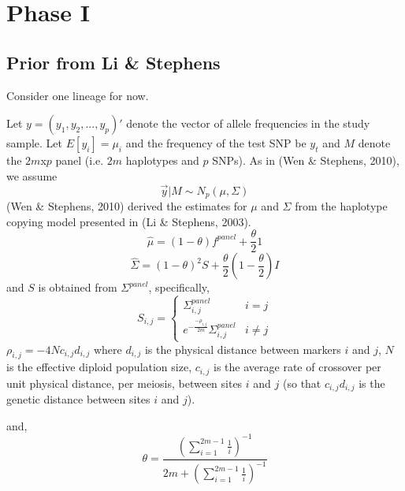\documentclass[10pt,a4paper,draft]{article}
\begin{document}
\section{Phase I}
\subsection{Prior from Li \& Stephens}
Consider one lineage for now.

Let  $y = (y_1, y_2, ..., y_p)'$ denote the vector of allele frequencies in the study sample.
Let $E[y_{i}] = \mu_{i}$ and the frequency of the test SNP be $y_{t}$  and $M$ denote the $2m$x$p$ panel (i.e. $2m$ haplotypes and $p$ SNPs). As in (Wen \& Stephens, 2010), we assume 
\begin{equation}
\vec{y} |M \sim N_p(\mu, \Sigma) \label{eq:prior}
\end{equation}
(Wen \& Stephens, 2010) derived the estimates for $\mu$ and $\Sigma$ from the haplotype copying model presented in (Li \& Stephens, 2003).
\begin{equation}
\hat{\mu} = (1-\theta)f^{panel} + \frac{\theta}{2}1 
\end{equation}
\begin{equation}
\hat{\Sigma} = (1-\theta)^2S + \frac{\theta}{2}(1-\frac{\theta}{2})I
\end{equation}
and $S$ is obtained from $\Sigma^{panel}$, specifically,
 \begin{equation}
   S_{i,j} = \left\{
     \begin{array}{lr}
       \Sigma_{i,j}^{panel} &  i =j\\
       e^{-\frac{-\rho_{i,j}}{2m}} \Sigma_{i,j}^{panel} &  i \neq j
     \end{array}
   \right.
\end{equation} 
$\rho_{i,j} = -4Nc_{i,j}d_{i,j}$ where $d_{i,j}$ is the physical distance between markers $i$ and $j$, $N$ is the effective diploid population size, $c_{i,j}$ is the average rate of crossover per unit physical distance, per meiosis, between sites $i$ and $j$ (so that $c_{i,j}d_{i,j}$ is the genetic distance between sites $i$ and $j$). 

and,
\begin{equation}
\theta = \frac{(\sum_{i=1}^{2m-1} \frac{1}{i})^{-1}}{2m + (\sum_{i=1}^{2m-1} \frac{1}{i})^{-1}}
\end{equation}

\iffalse
The distribution of $\{y_j: j \neq t\}$ given the test SNP,
\begin{equation}
\{y_i: i \neq t\} | y_t \sim N_{p-1}(\bar{\mu}, \bar{\Sigma}) \label{cond}
\end{equation}
where
\begin{align*}
\bar{\mu} = \vec{\mu_{i \neq t}} + \Sigma_{i \neq t, t}\frac{1}{\sigma_t^2}(y_t-\mu_{t}) 
\end{align*}
and
\begin{align*}
\hat{\Sigma} = \Sigma_{i \neq t, i \neq t} - \Sigma_{i \neq t, t}\frac{1}{\sigma_t^2}\Sigma_{t, i \neq t}
\end{align*}
\fi
\end{document}
